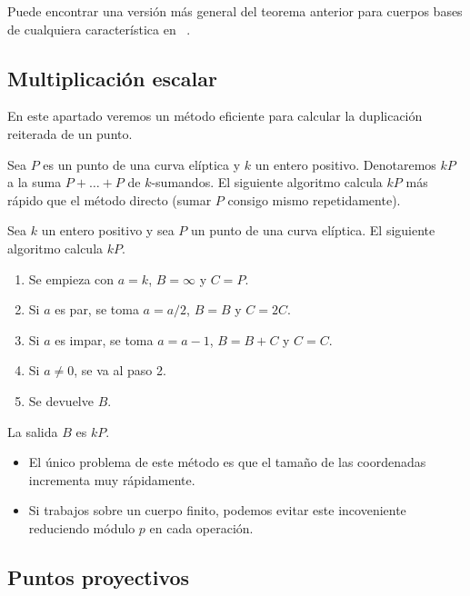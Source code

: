 \begin{nota}
	Puede encontrar una versión más general del teorema anterior para cuerpos bases de cualquiera característica en ~\cite{Silverman:2009}.
\end{nota}


\subsection{Multiplicación escalar}
\label{sub:Multiplicación escalar}

En este apartado veremos un método eficiente para calcular la duplicación reiterada de un punto.

Sea $P$ es un punto de una curva elíptica y $k$ un entero positivo. Denotaremos $k P$ a la suma $P + \ldots + P$ de $k$-sumandos. El siguiente algoritmo calcula $k P$ más rápido que el método directo (sumar $P$ consigo mismo repetidamente).

\begin{algoritmo}\label{al:multiplicación por duplicación}
	Sea $k$ un entero positivo y sea $P$ un punto de una curva elíptica. El siguiente algoritmo calcula $kP$.
	\begin{enumerate}
		\item Se empieza con $a = k$, $B = \infty$ y $C = P$.
		\item Si $a$ es par, se toma $a = a/2$, $B = B$ y $C = 2 C$.
		\item Si $a$ es impar, se toma $a = a -1$, $B = B + C$ y $C = C$.
		\item Si $a \neq 0$, se va al paso 2.
		\item Se devuelve $B$.
	\end{enumerate}
	La salida $B$ es $kP$.
\end{algoritmo}

\begin{nota}\leavevmode
	\begin{itemize}
		\item El único problema de este método es que el tamaño de las coordenadas incrementa muy rápidamente.
		\item Si trabajos sobre un cuerpo finito, podemos evitar este incoveniente reduciendo módulo $p$ en cada operación.
	\end{itemize}
\end{nota}

\subsection{Puntos proyectivos}
\label{sub:Puntos proyectivos}

